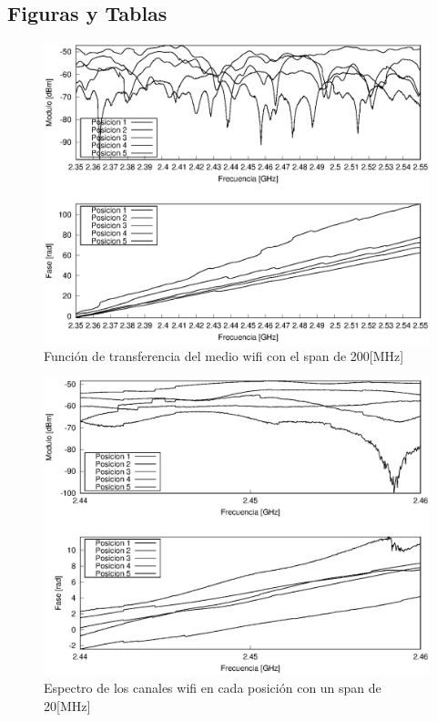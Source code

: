 \documentclass[10pt,conference,a4paper]{IEEEtran}
\begin{document}
\subsection{Figuras y Tablas}
\begin{figure}[htb]
    \centering
    \includegraphics[width=\columnwidth]{figuras/funcion_transferencia_wifi.eps}
    \caption{Función de transferencia del medio wifi con el span de 200[MHz]}
    \label{fig:transferencia_wifi}
\end{figure}
\begin{figure}[htb]
    \centering
    \includegraphics[width=\columnwidth]{figuras/funcion_transferencia_canal_wifi.eps}
    \caption{Espectro de los canales wifi en cada posición con un span de 20[MHz]}
    \label{fig:transferencia_canal_wifi}
\end{figure}
\end{document}
